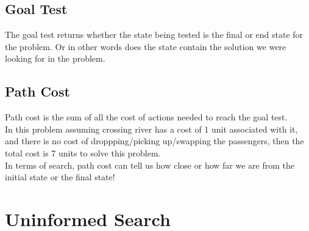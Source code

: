 \documentclass{article}
\begin{document}
	\subsection{Goal Test}
        The goal test returns whether the state being tested is the final or end state for the problem. Or in other words does the state contain the solution we were looking for in the problem.
	\subsection{Path Cost}
        Path cost is the sum of all the cost of actions needed to reach the goal test.\\In this problem assuming crossing river has a cost of 1 unit associated with it, and there is no cost of droppping/picking up/swapping the passengers, then the total cost is 7 units to solve this problem.\\
        In terms of search, path cost can tell us how close or how far we are from the initial state or the final state!\\
    \newpage
	\section{Uninformed Search}
\end{document}
